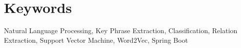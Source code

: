 \documentclass{article}
\begin{document}
\section*{Keywords}
Natural Language Processing, Key Phrase Extraction, Classification, Relation Extraction, Support Vector Machine, Word2Vec, Spring Boot

\pagebreak

\tableofcontents
\listoffigures
\listoftables
{}
\pagebreak












\pagebreak


\end{document}
